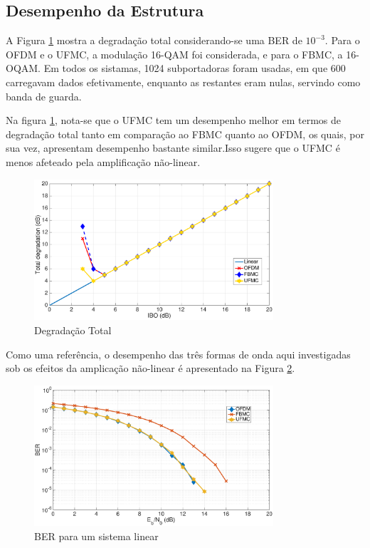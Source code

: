 \subsection{Desempenho da Estrutura}

A Figura \ref{fig:TD} mostra a degradação total considerando-se uma BER de $10^{-3}$. Para o OFDM e o UFMC, a modulação 16-QAM foi considerada, e para o FBMC, a 16-OQAM. Em todos os sistamas, 1024 subportadoras foram usadas, em que 600 carregavam dados efetivamente, enquanto as restantes eram nulas, servindo como banda de guarda. 

Na figura \ref{fig:TD}, nota-se que o UFMC tem um desempenho melhor em termos de degradação total tanto em comparação ao FBMC quanto ao OFDM, os quais, por sua vez, apresentam desempenho bastante similar.Isso sugere que o UFMC é menos afeteado pela amplificação não-linear.

\begin{figure}[h!]
\centering
\includegraphics[width=3.5in]{Total_degradation}
\caption{Degradação Total}
\label{fig:TD}
\end{figure}

Como uma referência, o desempenho das três formas de onda aqui investigadas sob os efeitos da amplicação não-linear é apresentado na Figura \ref{fig:linear}. 


\begin{figure}[h!]
\centering
\includegraphics[width=3.5in]{BER_Lin}
\caption{BER para um sistema linear}
\label{fig:linear}
\end{figure}

